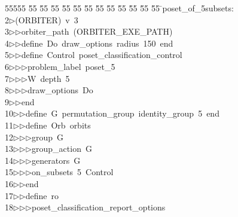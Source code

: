 %
%
\begin{tabbing}
55555 \= 55 \= 55 \= 55 \= 55 \= 55 \= 55 \= 55 \= 55 \= 55 \= 55 \= 55 \= 55 \= \>poset\_of\_5subsets:\\[0pt]
2\>$\triangleright$\>(ORBITER)\ v\ 3\ \\[0pt]
3\>$\triangleright$\>$\triangleright$\>orbiter\_path\ (ORBITER\_EXE\_PATH)\ \\[0pt]
4\>$\triangleright$\>$\triangleright$\>define\ Do\ draw\_options\ radius\ 150\ end\ \\[0pt]
5\>$\triangleright$\>$\triangleright$\>define\ Control\ poset\_classification\_control\ \\[0pt]
6\>$\triangleright$\>$\triangleright$\>$\triangleright$\>problem\_label\ poset\_5\ \\[0pt]
7\>$\triangleright$\>$\triangleright$\>$\triangleright$\>W\ depth\ 5\ \\[0pt]
8\>$\triangleright$\>$\triangleright$\>$\triangleright$\>draw\_options\ Do\ \\[0pt]
9\>$\triangleright$\>$\triangleright$\>end\ \\[0pt]
10\>$\triangleright$\>$\triangleright$\>define\ G\ permutation\_group\ identity\_group\ 5\ end\ \\[0pt]
11\>$\triangleright$\>$\triangleright$\>define\ Orb\ orbits\ \\[0pt]
12\>$\triangleright$\>$\triangleright$\>$\triangleright$\>group\ G\ \\[0pt]
13\>$\triangleright$\>$\triangleright$\>$\triangleright$\>group\_action\ G\ \\[0pt]
14\>$\triangleright$\>$\triangleright$\>$\triangleright$\>generators\ G\ \\[0pt]
15\>$\triangleright$\>$\triangleright$\>$\triangleright$\>on\_subsets\ 5\ Control\ \\[0pt]
16\>$\triangleright$\>$\triangleright$\>end\ \\[0pt]
17\>$\triangleright$\>$\triangleright$\>define\ ro\ \\[0pt]
18\>$\triangleright$\>$\triangleright$\>$\triangleright$\>poset\_classification\_report\_options\ \\[0pt]

\end{tabbing}
